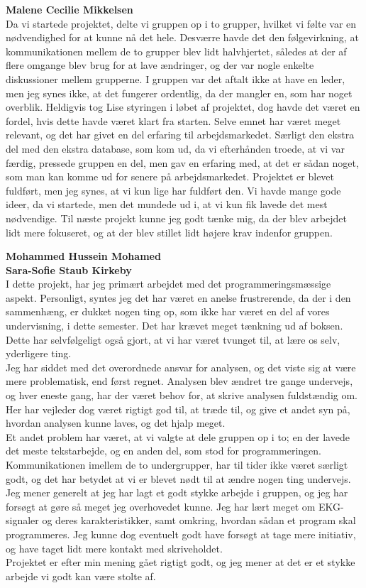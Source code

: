 \textbf{Malene Cecilie Mikkelsen}\\
Da vi startede projektet, delte vi gruppen op i to grupper, hvilket vi følte var en nødvendighed for at kunne nå det hele. Desværre havde det den følgevirkning, at kommunikationen mellem de to grupper blev lidt halvhjertet, således at der af flere omgange blev brug for at lave ændringer, og der var nogle enkelte diskussioner mellem grupperne. I gruppen var det aftalt ikke at have en leder, men jeg synes ikke, at det fungerer ordentlig, da der mangler en, som har noget overblik. Heldigvis tog Lise styringen i løbet af projektet, dog havde det været en fordel, hvis dette havde været klart fra starten. 
Selve emnet har været meget relevant, og det har givet en del erfaring til arbejdsmarkedet. Særligt den ekstra del med den ekstra database, som kom ud, da vi efterhånden troede, at vi var færdig, pressede gruppen en del, men gav en erfaring med, at det er sådan noget, som man kan komme ud for senere på arbejdsmarkedet.
Projektet er blevet fuldført, men jeg synes, at vi kun lige har fuldført den. Vi havde mange gode ideer, da vi startede, men det mundede ud i, at vi kun fik lavede det mest nødvendige. Til næste projekt kunne jeg godt tænke mig, da der blev arbejdet lidt mere fokuseret, og at der blev stillet lidt højere krav indenfor gruppen.

\textbf{Mohammed Hussein Mohamed}\\

\textbf{Sara-Sofie Staub Kirkeby}\\
I dette projekt, har jeg primært arbejdet med det programmeringsmæssige aspekt. Personligt, syntes jeg det har været en anelse frustrerende, da der i den sammenhæng, er dukket nogen ting op, som ikke har været en del af vores undervisning, i dette semester. Det har krævet meget tænkning ud af boksen. Dette har selvfølgeligt også gjort, at vi har været tvunget til, at lære os selv, yderligere ting. \\
Jeg har siddet med det overordnede ansvar for analysen, og det viste sig at være mere problematisk, end først regnet. Analysen blev ændret tre gange undervejs, og hver eneste gang, har der været behov for, at skrive analysen fuldstændig om. Her har vejleder dog været rigtigt god til, at træde til, og give et andet syn på, hvordan analysen kunne laves, og det hjalp meget.\\ 
Et andet problem har været, at vi valgte at dele gruppen op i to; en der lavede det meste tekstarbejde, og en anden del, som stod for programmeringen. Kommunikationen imellem de to undergrupper, har til tider ikke været særligt godt, og det har betydet at vi er blevet nødt til at ændre nogen ting undervejs. \\
Jeg mener generelt at jeg har lagt et godt stykke arbejde i gruppen, og jeg har forsøgt at gøre så meget jeg overhovedet kunne. Jeg har lært meget om EKG-signaler og deres karakteristikker, samt omkring, hvordan sådan et program skal programmeres. Jeg kunne dog eventuelt godt have forsøgt at tage mere initiativ, og have taget lidt mere kontakt med skriveholdet. \\
Projektet er efter min mening gået rigtigt godt, og jeg mener at det er et stykke arbejde vi godt kan være stolte af.

